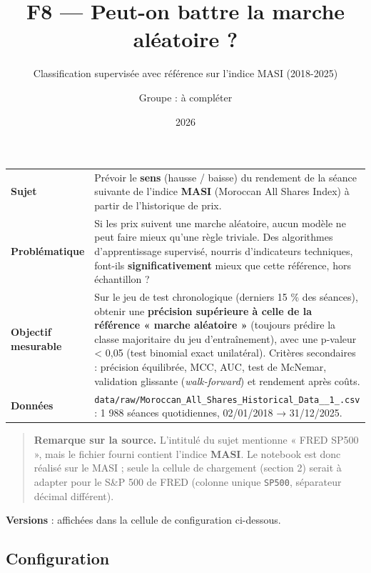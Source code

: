 \documentclass[
  10pt,
]{article}
\title{F8 --- Peut-on battre la marche aléatoire ?}
\subtitle{Classification supervisée avec référence sur l'indice MASI
(2018-2025)}
\author{Groupe : à compléter}
\date{2026}
\begin{document}
\maketitle

{
\hypersetup{linkcolor=}
\setcounter{tocdepth}{3}
\tableofcontents
}
\begin{longtable}[]{@{}
  >{\raggedright\arraybackslash}p{}
  >{\raggedright\arraybackslash}p{}@{}}
\toprule\noalign{}
\endhead
\bottomrule\noalign{}
\endlastfoot
\textbf{Sujet} & Prévoir le \textbf{sens} (hausse / baisse) du rendement
de la séance suivante de l'indice \textbf{MASI} (Moroccan All Shares
Index) à partir de l'historique de prix. \\
\textbf{Problématique} & Si les prix suivent une marche aléatoire, aucun
modèle ne peut faire mieux qu'une règle triviale. Des algorithmes
d'apprentissage supervisé, nourris d'indicateurs techniques, font-ils
\textbf{significativement} mieux que cette référence, hors échantillon
? \\
\textbf{Objectif mesurable} & Sur le jeu de test chronologique (derniers
15 \% des séances), obtenir une \textbf{précision supérieure à celle de
la référence « marche aléatoire »} (toujours prédire la classe
majoritaire du jeu d'entraînement), avec une p-valeur \textless{} 0,05
(test binomial exact unilatéral). Critères secondaires : précision
équilibrée, MCC, AUC, test de McNemar, validation glissante
(\emph{walk-forward}) et rendement après coûts. \\
\textbf{Données} &
\texttt{data/raw/Moroccan\_All\_Shares\_Historical\_Data\_\_1\_.csv} : 1
988 séances quotidiennes, 02/01/2018 → 31/12/2025. \\
\end{longtable}

\begin{quote}
\textbf{Remarque sur la source.} L'intitulé du sujet mentionne « FRED
SP500 », mais le fichier fourni contient l'indice \textbf{MASI}. Le
notebook est donc réalisé sur le MASI ; seule la cellule de chargement
(section 2) serait à adapter pour le S\&P 500 de FRED (colonne unique
\texttt{SP500}, séparateur décimal différent).
\end{quote}

\textbf{Versions} : affichées dans la cellule de configuration
ci-dessous.

\hypertarget{configuration}{%
\subsection{Configuration}\label{configuration}}
\end{document}
